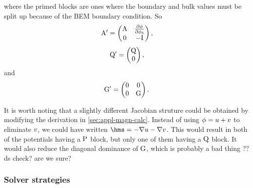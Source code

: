 
where the primed blocks are ones where the boundary and bulk values must be split up because of the BEM boundary condition.
So
\begin{equation}
  \mathrm{A}' =
  \begin{pmatrix}
     \mathrm{A}     & \frac{\partial \phi}{\partial \phi_b} \\
       0      & -\mathrm{I}  
  \end{pmatrix},
\end{equation}
\begin{equation}
  \mathrm{Q}' =
  \begin{pmatrix}
    \mathrm{Q} \\
    0    
  \end{pmatrix},
\end{equation}
and
\begin{equation}
  {\mathbf{\mathrm{G}}}' =
  \begin{pmatrix}
     0  & 0 \\
     0  & {\mathbf{\mathrm{G}}} 
  \end{pmatrix}.
\end{equation}


It is worth noting that a slightly different Jacobian struture could be obtained by modifying the derivation in \autoref{sec:appl-magn-calc}.
Instead of using $\phi = u + v$ to eliminate $v$, we could have written $\hms = - \grad \phione - \grad \phitwo$.
This would result in both of the potentials having a $\mathrm{P}$ block, but only one of them having a $\mathrm{Q}$ block.
It would also reduce the diagonal dominance of ${\mathbf{\mathrm{G}}}$, which is probably a bad thing ??ds check? are we sure?


\subsubsection{Solver strategies}
\label{sec:bem-solver-strategies}

